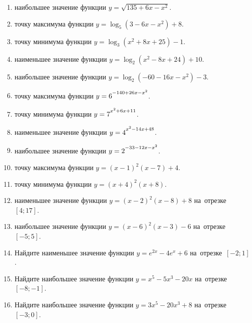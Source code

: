\documentclass[a4paper,10pt]{article}
\begin{document}
\begin{enumerate}
\item {} наибольшее значение функции $y=\sqrt{135+6x-x^2}$.

\item {} точку максимума функции $y=\log_5\left(3-6x-x^2\right)+8$.

\item {} точку минимума функции $y=\log_3\left(x^2+8x+25\right)-1$.

\item {} наименьшее значение функции $y=\log_2\left(x^2-8x+24\right)+10$.

\item {} наибольшее значение функции $y=\log_2\left(-60-16x-x^2\right)-3$.

\item {} точку максимума функции $y=6\strut^{-140+26x-x^2}$.

\item {} точку минимума функции $y=7\strut^{x^2+6x+11}$.

\item {} наименьшее значение функции $y=4\strut^{x^2-14x+48}$.

\item {} наибольшее значение функции $y=2\strut^{-33-12x-x^2}$.

\item {} точку максимума функции $y=\left(x-1\right)^2\left(x-7\right)+4$.

\item {} точку минимума функции $y=\left(x+4\right)^2\left(x+8\right)$.

\item {} наименьшее значение функции $y=\left(x-2\right)^2\left(x-8\right)+8$ на~отрезке~$\left[4;17\right]$.

\item {} наибольшее значение функции $y=\left(x-6\right)^2\left(x-3\right)-6$ на~отрезке~$\left[-5;5\right]$.

\item Найдите наименьшее значение функции $y=e^{2x}-4e^x+6$ на~отрезке~$\left[-2;1\right]$.

\item Найдите наибольшее значение функции $y=x^5-5x^3-20x$ на~отрезке~$\left[-8;-1\right]$.

\item Найдите наибольшее значение функции $y=3x^5-20x^3+8$ на~отрезке~$\left[-3;0\right]$.

\end{enumerate}
\end{document}
